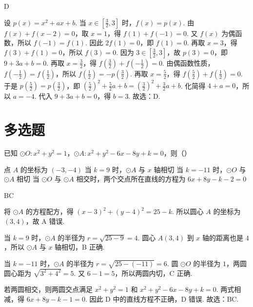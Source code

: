 \documentclass[UTF8,a4paper,oneside,11pt]{ctexbook}
\begin{document}
\begin{answer}
D
\end{answer}

\begin{solution}
设 \(p(x)=x^2+ax+b\). 当 \(x\in \left[ \frac{3}{2},3 \right]\) 时，\(f(x)=p(x)\).
由 \(f(x)+f(x-2)=0\)，取 \(x=1\)，得 \(f(1)+f(-1)=0\). 又 \(f(x)\) 为偶函数，所以 \(f(-1)=f(1)\). 因此 \(2f(1)=0\)，即 \(f(1)=0\). 再取 \(x=3\)，得 \(f(3)+f(1)=0\)，所以 \(f(3)=0\). 因为 \(3\in \left[ \frac{3}{2},3 \right]\)，故 \(p(3)=0\)，即 \(9+3a+b=0\).
再取 \(x=\frac{3}{2}\)，得 \(f\left( \frac{3}{2} \right)+f\left( -\frac{1}{2} \right)=0\). 由偶函数性质，\(f\left( -\frac{1}{2} \right)=f\left( \frac{1}{2} \right)\)，所以 \(f\left( \frac{1}{2} \right)=-p\left( \frac{3}{2} \right)\). 再取 \(x=\frac{5}{2}\)，得 \(f\left( \frac{5}{2} \right)+f\left( \frac{1}{2} \right)=0\). 于是 \(p\left( \frac{5}{2} \right)=p\left( \frac{3}{2} \right)\)，即 \(\left( \frac{5}{2} \right)^2+\frac{5}{2}a+b=\left( \frac{3}{2} \right)^2+\frac{3}{2}a+b\).
化简得 \(4+a=0\)，所以 \(a=-4\). 代入 \(9+3a+b=0\)，得 \(b=3\). 故选：D.
\end{solution}
\section{多选题}

\begin{problem}
已知 \(\odot O:x^2+y^2=1\)，\(\odot A:x^2+y^2-6x-8y+k=0\)，则（\quad）

\choices
    {点 \(A\) 的坐标为 \(\left( -3,-4 \right)\)}
    {当 \(k=9\) 时，\(\odot A\) 与 \(x\) 轴相切}
    {当 \(k=-11\) 时，\(\odot O\) 与 \(\odot A\) 相切}
    {当 \(\odot O\) 与 \(\odot A\) 相交时，两个交点所在直线的方程为 \(6x+8y-k-2=0\)}
\end{problem}

\begin{answer}
BC
\end{answer}

\begin{solution}
将 \(\odot A\) 的方程配方，得 \(\left( x-3 \right)^2+\left( y-4 \right)^2=25-k\). 所以圆心 \(A\) 的坐标为 \(\left( 3,4 \right)\)，故 A 错误.

当 \(k=9\) 时，\(\odot A\) 的半径为 \(r=\sqrt{25-9}=4\). 圆心 \(A\left( 3,4 \right)\) 到 \(x\) 轴的距离也是 \(4\)，所以 \(\odot A\) 与 \(x\) 轴相切，B 正确.

当 \(k=-11\) 时，\(\odot A\) 的半径为 \(r=\sqrt{25-(-11)}=6\). 圆 \(\odot O\) 的半径为 \(1\)，两圆圆心距为 \(\sqrt{3^2+4^2}=5\). 又 \(6-1=5\)，所以两圆内切，C 正确.

若两圆相交，则两圆交点满足 \(x^2+y^2=1\) 和 \(x^2+y^2-6x-8y+k=0\). 两式相减，得 \(6x+8y-k-1=0\). 因此 D 中的直线方程不正确，D 错误.
故选：BC.
\end{solution}
\end{document}
